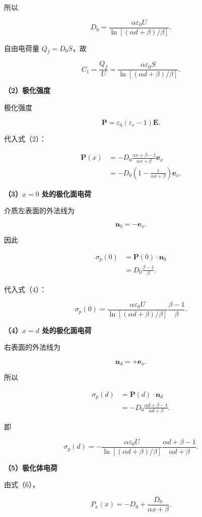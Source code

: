 \documentclass[12pt,a4paper,UTF8]{ctexart}
\begin{document}
所以

\[
D_0
=\frac{\alpha\varepsilon_0U}
{\ln[(\alpha d+\beta)/\beta]}.
\tag{4}
\]

自由电荷量 \(Q_f=D_0S\)，故

\[
\boxed{
C_1=\frac{Q_f}{U}
=\frac{\alpha\varepsilon_0S}
{\ln[(\alpha d+\beta)/\beta]}
}.
\tag{5}
\]

\textbf{（2）极化强度}

极化强度

\[
\bm P
=\varepsilon_0(\varepsilon_r-1)\bm E.
\]

代入式（2）：

\[
\begin{aligned}
\bm P(x)
&=-D_0
\frac{\alpha x+\beta-1}{\alpha x+\beta}\bm e_x\\
&=-D_0\left(1-\frac1{\alpha x+\beta}\right)\bm e_x.
\end{aligned}
\tag{6}
\]

\textbf{（3）\(x=0\) 处的极化面电荷}

介质左表面的外法线为

\[
\bm n_0=-\bm e_x.
\]

因此

\[
\begin{aligned}
\sigma_p(0)
&=\bm P(0)\cdot\bm n_0\\
&=D_0\frac{\beta-1}{\beta}.
\end{aligned}
\]

代入式（4）：

\[
\boxed{
\sigma_p(0)
=\frac{\alpha\varepsilon_0U}
{\ln[(\alpha d+\beta)/\beta]}
\frac{\beta-1}{\beta}
}.
\tag{7}
\]

\textbf{（4）\(x=d\) 处的极化面电荷}

右表面的外法线为

\[
\bm n_d=+\bm e_x.
\]

所以

\[
\begin{aligned}
\sigma_p(d)
&=\bm P(d)\cdot\bm n_d\\
&=-D_0
\frac{\alpha d+\beta-1}{\alpha d+\beta}.
\end{aligned}
\]

即

\[
\boxed{
\sigma_p(d)
=-\frac{\alpha\varepsilon_0U}
{\ln[(\alpha d+\beta)/\beta]}
\frac{\alpha d+\beta-1}{\alpha d+\beta}
}.
\tag{8}
\]

\textbf{（5）极化体电荷}

由式（6），

\[
P_x(x)=-D_0+\frac{D_0}{\alpha x+\beta}.
\]
\end{document}
